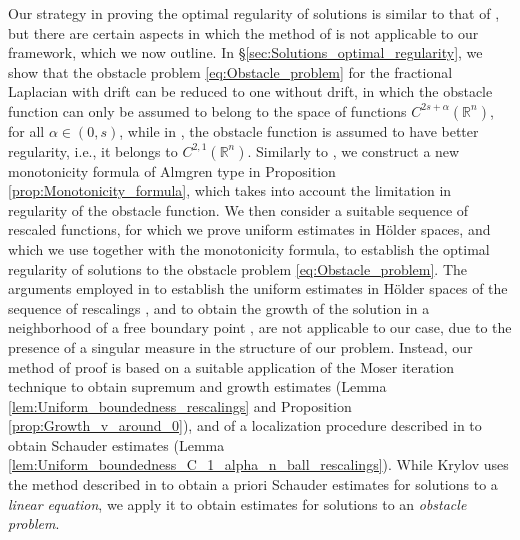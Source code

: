 \documentclass[11pt,reqno]{amsart}
\theoremstyle{definition}
\theoremstyle{remark}
\begin{document}
Our strategy in proving the optimal regularity of solutions is similar to that of \cite{Caffarelli_Salsa_Silvestre_2008}, but there are certain aspects in which the method of \cite{Caffarelli_Salsa_Silvestre_2008} is not applicable to our framework, which we now outline. In \S \ref{sec:Solutions_optimal_regularity}, we show that the obstacle problem \eqref{eq:Obstacle_problem} for the fractional Laplacian with drift can be reduced to one without drift, in which the obstacle function can only be assumed to belong to the space of functions $C^{2s+\alpha}({\mathbb{R}}^n)$, for all $\alpha\in (0,s)$, while in \cite{Caffarelli_Salsa_Silvestre_2008}, the obstacle function is assumed to have better regularity, i.e., it belongs to $C^{2,1}({\mathbb{R}}^n)$. Similarly to \cite{Caffarelli_Salsa_Silvestre_2008}, we construct a new monotonicity formula of Almgren type in Proposition \ref{prop:Monotonicity_formula}, which takes into account the limitation in regularity of the obstacle function. We then consider a suitable sequence of rescaled functions, for which we prove uniform estimates in H\"older spaces, and which we use together with the monotonicity formula, to establish the optimal regularity of solutions to the obstacle problem \eqref{eq:Obstacle_problem}. The arguments employed in \cite{Caffarelli_Salsa_Silvestre_2008} to establish the uniform estimates in H\"older spaces of the sequence of rescalings \cite[Proposition 4.3]{Caffarelli_Salsa_Silvestre_2008}, and to obtain the growth of the solution in a neighborhood of a free boundary point \cite[Lemma 6.5]{Caffarelli_Salsa_Silvestre_2008}, are not applicable to our case, due to the presence of a singular measure in the structure of our problem. Instead, our method of proof is based on a suitable application of the Moser iteration technique to obtain supremum and growth estimates (Lemma \ref{lem:Uniform_boundedness_rescalings} and Proposition \ref{prop:Growth_v_around_0}), and of a localization procedure described in \cite[Theorem 8.11.1]{Krylov_LecturesHolder} to obtain Schauder estimates (Lemma \ref{lem:Uniform_boundedness_C_1_alpha_n_ball_rescalings}). While Krylov uses the method described in \cite[Theorem 8.11.1]{Krylov_LecturesHolder} to obtain a priori Schauder estimates for solutions to a \emph{linear equation}, we apply it to obtain estimates for solutions to an \emph{obstacle problem}.
\end{document}
